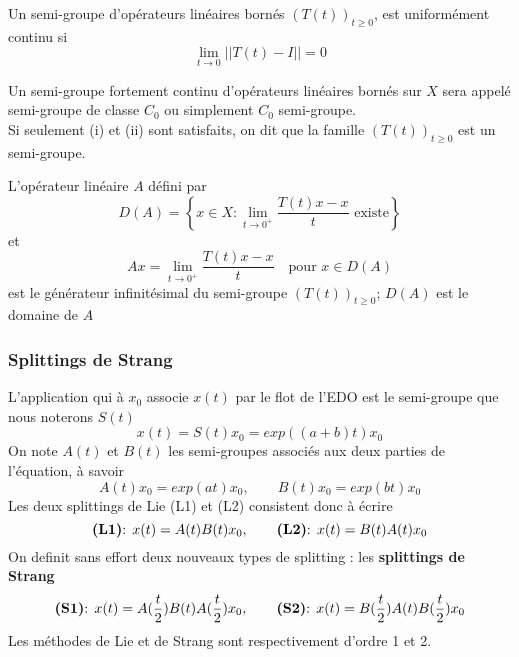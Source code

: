 \begin{remark}
	Un semi-groupe d'opérateurs linéaires bornés $(T(t))_{t\geq 0}$, est uniformément continu si
	$$
	\lim_{t \rightarrow 0} ||T(t)-I||=0
	$$
\end{remark}
Un semi-groupe fortement continu d'opérateurs linéaires bornés sur $X$ sera appelé semi-groupe de classe $C_0$ ou simplement $C_0$ semi-groupe.\\

Si seulement (i) et (ii) sont satisfaits, on dit que la famille $(T(t))_{t\geq 0}$ est un semi-groupe.
\begin{definition}
	L'opérateur linéaire $A$ défini par
	\begin{equation}
	D(A)= \left \{ x \in X : \lim_{t \rightarrow 0^+} \dfrac{T(t)x-x}{t} \mbox{ existe} \right \}
	\end{equation}
	et
	\begin{equation}
	Ax=\lim_{t \rightarrow 0^+} \dfrac{T(t)x-x}{t} \quad \mbox{pour } x \in D(A)
	\end{equation}
	est le générateur infinitésimal du semi-groupe $(T(t))_{t\geq 0}$; $D(A)$ est le domaine de $A$
\end{definition}
\subsubsection{Splittings de Strang}
L’application qui à $x_0$ associe $x(t)$ par le flot de l’EDO est le semi-groupe que nous noterons $S(t)$
\begin{equation}
x(t)=S(t)x_0=exp((a+b)t)x_0
\end{equation}
On note $A(t)$ et $B(t)$ les semi-groupes associés aux deux parties de l’équation, à savoir
$$
A(t)x_0=exp(at)x_0, \quad \quad B(t)x_0=exp(bt)x_0
$$
Les deux splittings de Lie (L1) et (L2) consistent donc à écrire
$$
\mbox{\textbf{(L1)}: } x(t)=A(t)B(t)x_0, \quad \quad \mbox{\textbf{(L2)}: } x(t)=B(t)A(t)x_0
$$
On definit sans effort deux nouveaux types de splitting : les \textbf{splittings de Strang} \cite{Strang}
$$
\mbox{\textbf{(S1)}: } x(t)=A(\dfrac{t}{2})B(t)A(\dfrac{t}{2})x_0, \quad \quad \mbox{\textbf{(S2)}: } x(t)=B(\dfrac{t}{2})A(t)B(\dfrac{t}{2})x_0
$$
Les méthodes de Lie et de Strang sont respectivement d’ordre 1 et 2.
